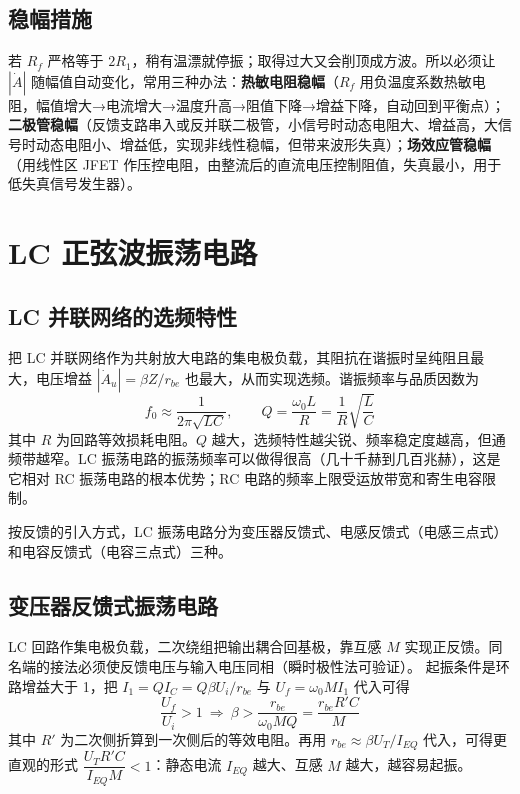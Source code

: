 \subsection{稳幅措施}
若 $R_f$ 严格等于 $2R_1$，稍有温漂就停振；取得过大又会削顶成方波。所以必须让 $|\dot A|$ 随幅值自动变化，常用三种办法：\textbf{热敏电阻稳幅}（$R_f$ 用负温度系数热敏电阻，幅值增大→电流增大→温度升高→阻值下降→增益下降，自动回到平衡点）；\textbf{二极管稳幅}（反馈支路串入或反并联二极管，小信号时动态电阻大、增益高，大信号时动态电阻小、增益低，实现非线性稳幅，但带来波形失真）；\textbf{场效应管稳幅}（用线性区 JFET 作压控电阻，由整流后的直流电压控制阻值，失真最小，用于低失真信号发生器）。

\section{LC 正弦波振荡电路}
\subsection{LC 并联网络的选频特性}
把 LC 并联网络作为共射放大电路的集电极负载，其阻抗在谐振时呈纯阻且最大，电压增益 $|\dot A_u|=\beta Z/r_{be}$ 也最大，从而实现选频。谐振频率与品质因数为
\begin{equation}
f_0\approx\frac{1}{2\pi\sqrt{LC}},\qquad
Q=\frac{\omega_0 L}{R}=\frac{1}{R}\sqrt{\frac{L}{C}}
\end{equation}
其中 $R$ 为回路等效损耗电阻。$Q$ 越大，选频特性越尖锐、频率稳定度越高，但通频带越窄。LC 振荡电路的振荡频率可以做得很高（几十千赫到几百兆赫），这是它相对 RC 振荡电路的根本优势；RC 电路的频率上限受运放带宽和寄生电容限制。

按反馈的引入方式，LC 振荡电路分为变压器反馈式、电感反馈式（电感三点式）和电容反馈式（电容三点式）三种。

\subsection{变压器反馈式振荡电路}
LC 回路作集电极负载，二次绕组把输出耦合回基极，靠互感 $M$ 实现正反馈。同名端的接法必须使反馈电压与输入电压同相（瞬时极性法可验证）。
起振条件是环路增益大于 1，把 $I_1=QI_C=Q\beta U_i/r_{be}$ 与 $U_f=\omega_0MI_1$ 代入可得
\begin{equation}
\frac{U_f}{U_i}>1\ \Longrightarrow\
\beta>\frac{r_{be}}{\omega_0 M Q}=\frac{r_{be}R'C}{M}
\end{equation}
其中 $R'$ 为二次侧折算到一次侧后的等效电阻。再用 $r_{be}\approx\beta U_T/I_{EQ}$ 代入，可得更直观的形式 $\dfrac{U_T R'C}{I_{EQ}M}<1$：静态电流 $I_{EQ}$ 越大、互感 $M$ 越大，越容易起振。


